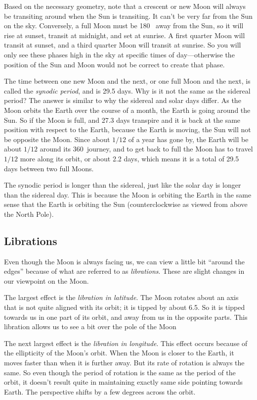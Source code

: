 \documentclass[12pt, preprint]{aastex}
\begin{document}
Based on the necessary geometry, note that a crescent or new Moon will
always be transiting around when the Sun is transiting. It can't be
very far from the Sun on the sky. Conversely, a full Moon must be 180
\degree\ away from the Sun, so it will rise at sunset, transit at
midnight, and set at sunrise. A first quarter Moon will transit at
sunset, and a third quarter Moon will transit at sunrise. So you will
only see these phases high in the sky at specific times of
day---otherwise the position of the Sun and Moon would not be correct
to create that phase.

The time between one new Moon and the next, or one full Moon and the
next, is called the {\it synodic period}, and is 29.5 days. Why is it
not the same as the sidereal period? The answer is similar to why the
sidereal and solar days differ. As the Moon orbits the Earth over the
course of a month, the Earth is going around the Sun. So if the Moon
is full, and 27.3 days transpire and it is back at the same position
with respect to the Earth, because the Earth is moving, the Sun will
not be opposite the Moon. Since about $1/12$ of a year has gone by,
the Earth will be about $1/12$ around its 360\degree\ journey, and to
get back to full the Moon has to travel $1/12$ more along its orbit,
or about 2.2 days, which means it is a total of 29.5 days between two
full Moons.

The synodic period is longer than the sidereal, just like the solar
day is longer than the sidereal day. This is because the Moon is
orbiting the Earth in the same sense that the Earth is orbiting the
Sun (counterclockwise as viewed from above the North Pole). 

\subsection{Librations}

Even though the Moon is always facing us, we can view a little bit
``around the edges'' because of what are referred to as {\it
  librations}. These are slight changes in our viewpoint on the Moon.

The largest effect is the {\it libration in latitude}. The Moon rotates
about an axis that is not quite aligned with its orbit; it is tipped
by about 6.5\degree. So it is tipped towards us in one part of its
orbit, and away from us in the opposite parts. This libration allows
us to see a bit over the pole of the Moon

The next largest effect is the {\it libration in longitude}. This
effect occurs because of the ellipticity of the Moon's orbit. When the
Moon is closer to the Earth, it moves faster than when it is further
away. But its rate of rotation is always the same. So even though the
period of rotation is the same as the period of the orbit, it doesn't
result quite in maintaining  exactly same side pointing towards
Earth. The perspective shifts by a few degrees across the orbit.
\end{document}
